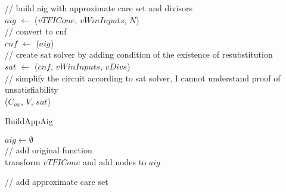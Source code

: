 \documentclass{rpt}
\begin{document}
\begin{algorithm}[H]
\begin{small}
        \vspace{1em}
        // build aig with approximate care set and divisors\\
        $aig$ $\leftarrow$ \BuildAppAig($vTFICone$, $vWinInputs$, $N$)\\
        // convert to cnf\\
        $cnf$ $\leftarrow$ \AigToCnf($aig$)\\
        // create sat solver by adding condition of the existence of resubstitution\\
        $sat$ $\leftarrow$ \CreateSolver($cnf$, $vWinInputs$, $vDivs$)\\

        \vspace{1em}
        // simplify the circuit according to sat solver, I cannot understand proof of unsatisfiability\\
        \ResubNode($C_{ax}$, $V$, $sat$)
    \end{small}
\end{algorithm}

\begin{algorithm}[H]
    \caption{\small BuildAppAig}
    \begin{small}

        \vspace{1em}
        $aig \leftarrow\emptyset$\\
        // add original function\\
        transform $vTFICone$ and add nodes to $aig$

        \vspace{1em}
        // add approximate care set\\


        \vspace{1em}
    \end{small}
\end{algorithm}
\end{document}
